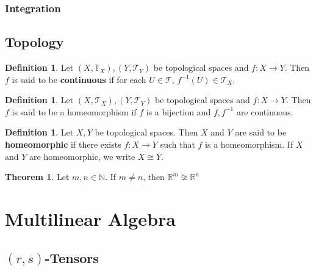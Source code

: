 \documentclass{book}
\theoremstyle{definition}
\newtheorem{defn}[definition]{Definition}
\newtheorem{thm}[definition]{Theorem}
\newcommand{\N}{\mathbb{N}}
\newcommand{\R}{\mathbb{R}}
\newcommand{\T}{\mathbb{T}}
\newcommand{\MT}{\mathcal{T}}
\DeclareMathOperator*{\0}{\mbf{0}}
\DeclareMathOperator*{\1}{\mbf{1}}
\newcommand{\tbf}[1]{\textbf{#1}}
\begin{document}
	
	
	\subsection{Integration}














\newpage
\section{Topology}

\begin{defn}
Let $(X, \T_X), (Y, \MT_Y)$ be topological spaces and $f:X\rightarrow Y$. Then $f$ is said to be \tbf{continuous} if for each $U \in \MT$, $f^{-1}(U) \in \MT_X$.
\end{defn}

\begin{defn}
Let $(X, \MT_X), (Y, \MT_Y)$ be topological spaces and $f:X\rightarrow Y$. Then $f$ is said to be a homeomorphism if $f$ is a bijection and $f, f^{-1}$ are continuous. 
\end{defn}

\begin{defn}
Let $X, Y$ be topological spaces. Then $X$ and $Y$ are said to be \tbf{homeomorphic} if there exists $f:X \rightarrow Y$ such that $f$ is a homeomorphism. If $X$ and $Y$ are homeomorphic, we write $X \cong Y$. 
\end{defn}

\begin{thm}
Let $m,n \in \N$. If $m \neq n$, then $\R^m \not \cong \R^n$
\end{thm}






















\newpage
	\chapter{Multilinear Algebra}
	
	\section{$(r,s)$-Tensors}
	
\end{document}

